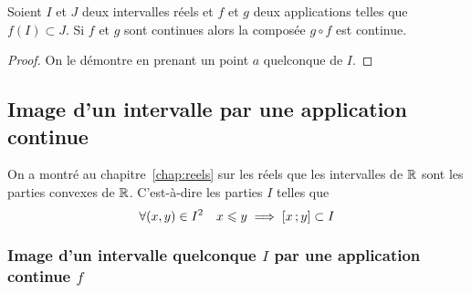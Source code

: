 \begin{prop}
  Soient \(I\) et \(J\) deux intervalles réels et \(f\) et \(g\) deux 
  applications telles que \(f(I) \subset J\). Si \(f\) et \(g\) sont continues 
  alors la composée \(g \circ f\) est continue.
\end{prop}
\begin{proof}
  On le démontre en prenant un point \(a\) quelconque de \(I\).
\end{proof}

\subsection{Image d'un intervalle par une application continue}

\begin{rappel}
  On a montré au chapitre~\ref{chap:reels} sur les réels que les intervalles de
  \(\mathbb{R}\) sont les parties 
  convexes de \(\mathbb{R}\). C'est-à-dire les parties \(I\) telles que
  \begin{equation}
    \forall (x,y) \in I^2 \quad x \leqslant y \implies \left[ x \, ; {} y \right] 
    \subset I
  \end{equation}
\end{rappel}

\subsubsection[Image continue d'un intervalle quelconque]{Image d'un intervalle 
quelconque \(I\) par une application continue \(f\)}

